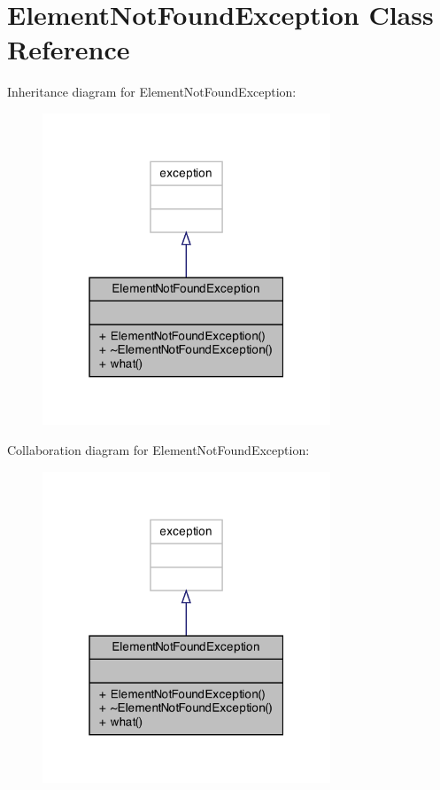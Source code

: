 \hypertarget{class_element_not_found_exception}{\section{Element\+Not\+Found\+Exception Class Reference}
\label{class_element_not_found_exception}
}


Inheritance diagram for Element\+Not\+Found\+Exception\+:\nopagebreak
\begin{figure}[H]
\begin{center}
\leavevmode
\includegraphics[width=244pt]{class_element_not_found_exception__inherit__graph}
\end{center}
\end{figure}


Collaboration diagram for Element\+Not\+Found\+Exception\+:\nopagebreak
\begin{figure}[H]
\begin{center}
\leavevmode
\includegraphics[width=244pt]{class_element_not_found_exception__coll__graph}
\end{center}
\end{figure}
